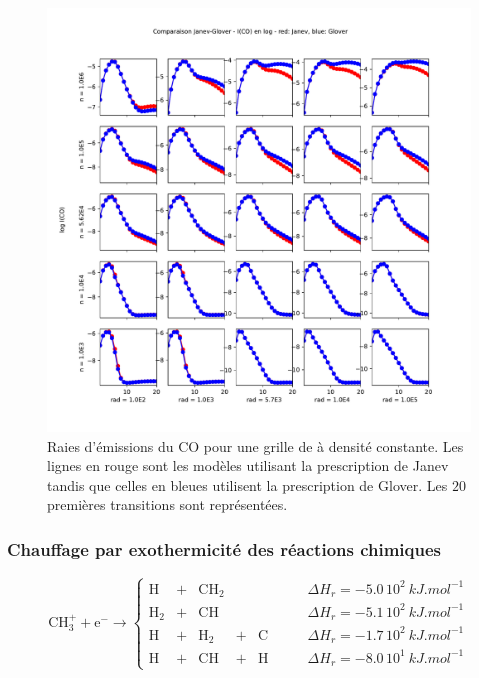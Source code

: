 \begin{figure}[!h]
    \centering
    \includegraphics[trim = {0 0 0 3cm },clip,width=1\textwidth]{figure/H2/bosse_dcte_janevVSglover/PlotComp_Janev_Glover_IntCO.pdf}
    \caption{Raies d'émissions du $\mathrm{CO}$ pour une grille de à densité constante. Les lignes en rouge sont les modèles utilisant la prescription de Janev tandis que celles en bleues utilisent la prescription de Glover. Les $20$ premières transitions sont représentées.}
    \label{fig:H2:bosse:IgridCO}
\end{figure}

\subsubsection{Chauffage par exothermicité des réactions chimiques}

\begin{equation*}
     \mathrm{CH}_3^+ +  \mathrm{e}^- \rightarrow \left\{ 
    \begin{array}{lcccclr}
         \mathrm{H} &+& \mathrm{CH}_2  & & & \qquad \Delta H_r = - 5.0\,10^2 \ kJ.mol^{-1}\\
         \mathrm{H}_2 &+& \mathrm{CH}  & & & \qquad \Delta H_r = - 5.1\,10^2 \ kJ.mol^{-1}\\
         \mathrm{H} &+& \mathrm{H}_2 &+& \mathrm{C}  & \qquad \Delta H_r = - 1.7\,10^2 \ kJ.mol^{-1}\\
         \mathrm{H} &+& \mathrm{CH} &+& \mathrm{H} & \qquad  \Delta H_r = - 8.0\,10^1 \ kJ.mol^{-1}
    \end{array}\right.
\end{equation*}

